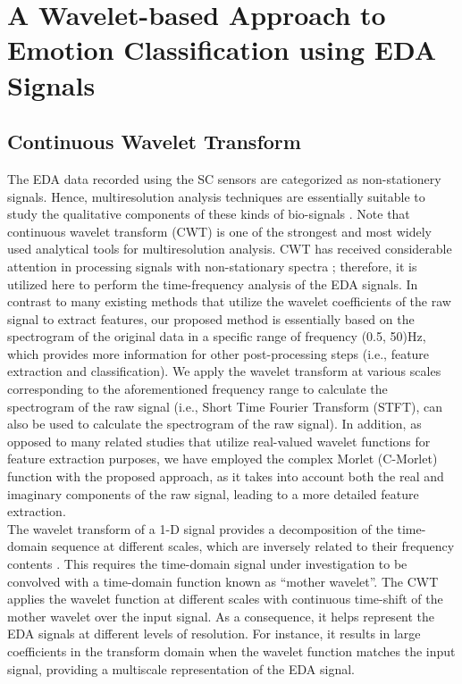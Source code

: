 \chapter{A Wavelet-based Approach to Emotion Classification using EDA Signals}

\section{Continuous Wavelet Transform}
The EDA data recorded using the SC sensors are categorized as non-stationery signals\cite{AmbulatorySys2003, EmotionalState2013}. Hence, multiresolution analysis 
techniques are essentially suitable to study the qualitative components of these 
kinds of bio-signals \cite{AmbulatorySys2003}.  Note that continuous wavelet transform 
(CWT) is one of the strongest and most widely used analytical tools for multiresolution 
analysis. CWT has received considerable attention in processing signals with 
non-stationary spectra \cite{WaveletFilter1992, SignalDecomp1989}; therefore, it is 
utilized here to perform the time-frequency analysis of the EDA signals. In contrast 
to many existing methods that utilize the wavelet coefficients of the raw signal to 
extract features, our proposed method is essentially based on the spectrogram of the 
original data in a specific range of frequency (0.5, 50)Hz, which provides more 
information for other post-processing steps (i.e., feature extraction and classification).
We apply the wavelet transform at various scales corresponding to the 
aforementioned frequency range to calculate the spectrogram of the raw signal 
(i.e., Short Time Fourier Transform (STFT), can also be used to calculate the 
spectrogram of the raw signal). In addition, as opposed to many related studies 
that utilize real-valued wavelet functions for feature extraction purposes, we have 
employed the complex Morlet (C-Morlet) function with the proposed approach, as it 
takes into account both the real and imaginary components of the raw signal, leading 
to a more detailed feature extraction.\\

The wavelet transform of a 1-D signal provides a decomposition of the time-domain 
sequence at different scales, which are inversely related to their frequency contents\cite{SignalDecomp1989, ContinuWavelet2009} . This requires the time-domain signal under 
investigation to be convolved with a time-domain function known as “mother wavelet”. 
The CWT applies the wavelet function at different scales with continuous time-shift 
of the mother wavelet over the input signal. As a consequence, it helps represent 
the EDA signals at different levels of resolution. For instance, it results in large 
coefficients in the transform domain when the wavelet function matches the input 
signal, providing a multiscale representation of the EDA signal.\\

